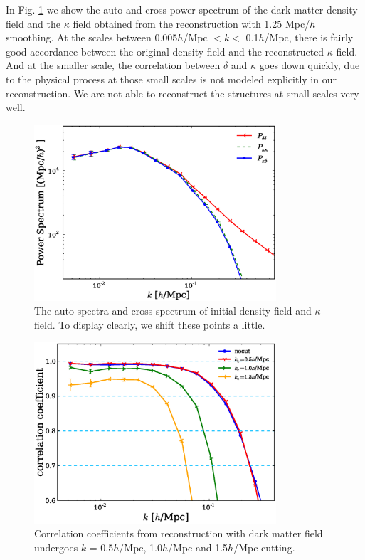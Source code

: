 \documentclass[aps,prd,twocolumn,showpacs,superscriptaddress,groupedaddress,nofootinbib]{revtex4}  %
\begin{document}
In Fig. \ref{1Dspec_dm} we show the auto and cross power spectrum of the dark matter density field and the $\kappa$ field obtained from the reconstruction with 1.25 Mpc/$h$ smoothing. At the scales between 0.005$h$/Mpc $< k <$ 0.1$h$/Mpc, there is fairly good accordance between the original density field and the reconstructed $\kappa$ field. And at the smaller scale, the correlation between $\delta$ and $\kappa$ goes down quickly, due to the physical process at those small scales is not modeled explicitly in our reconstruction. We are not able to reconstruct the structures at small scales very well.

\begin{figure}[h!]
     \centering
     \includegraphics[width=9cm]{1Dspec_dm.eps}
     \caption{The auto-spectra and cross-spectrum of initial density field and $\kappa$ field. To display clearly, we shift these points a little.}
     \label{1Dspec_dm}
\end{figure}

\begin{figure}[!htp]
      \centering
      \includegraphics[width=9cm]{1D_correlation_aver_cut.eps}
      \caption{Correlation coefficients from reconstruction with dark matter field undergoes $k$ = 0.5$h$/Mpc, 1.0$h$/Mpc and 1.5$h$/Mpc cutting.}
      \label{1D_correlation_aver_cut}
\end{figure}
\end{document}
